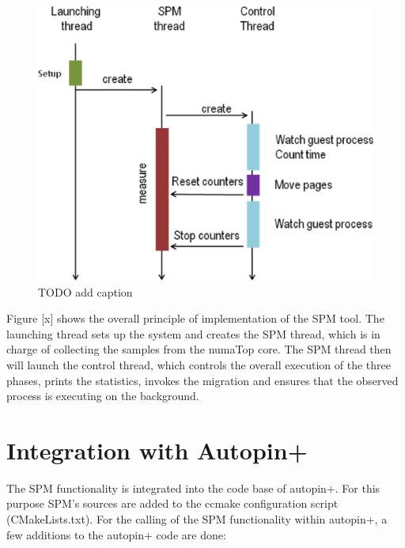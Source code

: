 \begin{figure}
	\centering
		\includegraphics[width=.9\textwidth]{figures/sequence.eps}
		\caption[basic-uma]{TODO add caption}
		\label{fig:dstrategy}
\end{figure}

Figure [x] shows the overall principle of implementation of the SPM tool. The launching thread sets up the system and creates the SPM thread, which is in charge of collecting the samples from the numaTop core. The SPM thread then will launch the control thread, which controls the overall execution of the three phases, prints the statistics, invokes the migration and ensures that the observed process is executing on the background.

\section{Integration with Autopin+}\label{section:apin+intgr}

The SPM functionality is integrated into the code base of autopin+. For this purpose SPM’s sources are added to the ccmake configuration script (CMakeLists.txt).
For the calling of the SPM functionality within autopin+, a few additions to the autopin+ code are done:

